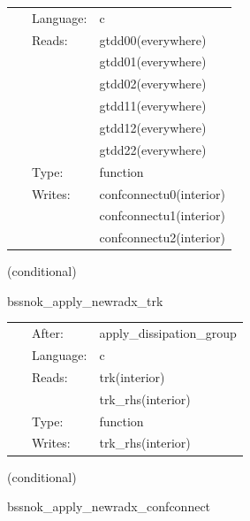\documentclass{article}
\begin{document}
 \begin{tabular*}{160mm}{cll} 
~ & Language:  & c \\ 
~ & Reads:  & gtdd00(everywhere) \\ 
~& ~ &gtdd01(everywhere)\\ 
~& ~ &gtdd02(everywhere)\\ 
~& ~ &gtdd11(everywhere)\\ 
~& ~ &gtdd12(everywhere)\\ 
~& ~ &gtdd22(everywhere)\\ 
~ & Type:  & function \\ 
~ & Writes:  & confconnectu0(interior) \\ 
~& ~ &confconnectu1(interior)\\ 
~& ~ &confconnectu2(interior)\\ 
\end{tabular*} 


\vspace{5mm}

   (conditional) 

\hspace{5mm} bssnok\_apply\_newradx\_trk 



\hspace{5mm}

 \begin{tabular*}{160mm}{cll} 
~ & After:  & apply\_dissipation\_group \\ 
~ & Language:  & c \\ 
~ & Reads:  & trk(interior) \\ 
~& ~ &trk\_rhs(interior)\\ 
~ & Type:  & function \\ 
~ & Writes:  & trk\_rhs(interior) \\ 
\end{tabular*} 


\vspace{5mm}

   (conditional) 

\hspace{5mm} bssnok\_apply\_newradx\_confconnect 

\end{document}
